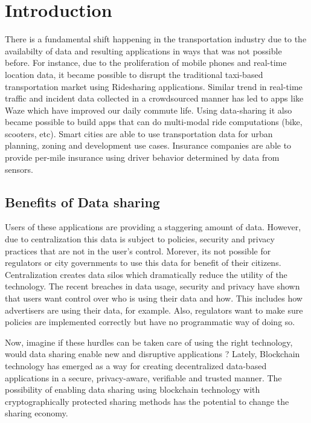 \section{Introduction}\label{sec:intro}

There is a fundamental shift happening in the transportation industry due to the availabilty of data and resulting
applications in ways that was not possible before. For instance, due to the proliferation of mobile phones and real-time
location data, it became possible to disrupt the traditional taxi-based transportation market using Ridesharing
applications. Similar trend in real-time traffic and incident data collected in a crowdsourced manner has led to apps
like Waze which have improved our daily commute life. Using data-sharing it also became possible to build apps that can
do multi-modal ride computations (bike, scooters, etc). Smart cities are able to use transportation data for
urban planning, zoning and development use cases. Insurance companies are able to provide per-mile insurance using
driver behavior determined by data from sensors.

\subsection{Benefits of Data sharing}


Users of these applications are providing a staggering amount of data. However, due to centralization this data is
subject to policies, security and privacy practices that are not in the user's control. Morever, its not possible for
regulators or city governments to use this data for benefit of their citizens. Centralization creates data silos which
dramatically reduce the utility of the technology. The recent breaches in data usage, security and privacy have shown
that users want control over who is using their data and how. This includes how advertisers are using their data, for
example. Also, regulators want to make sure policies are implemented correctly but have no programmatic way of doing so.

Now, imagine if these hurdles can be taken care of using the right technology, would data sharing enable new and
disruptive applications ? Lately, Blockchain technology has emerged as a way for creating decentralized data-based
applications in a secure, privacy-aware, verifiable and trusted manner. The possibility of enabling data sharing using
blockchain technology with cryptographically protected sharing methods has the potential to change the sharing economy.

